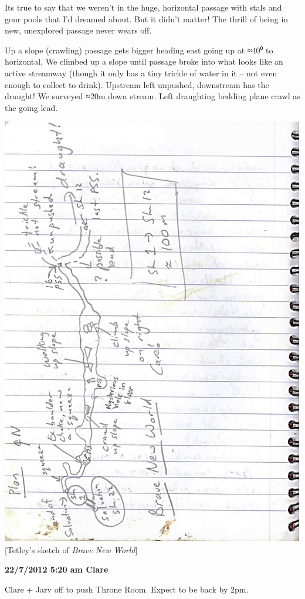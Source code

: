 Its true to say that we weren't in the huge, horizontal passage with
stals and gour pools that I'd dreamed about. But it didn't matter! The
thrill of being in new, unexplored passage never wears off.

Up a slope (crawling) passage gets bigger heading east going up at ≈40⁰
to horizontal. We climbed up a slope until passage broke into what looks
like an active streamway (though it only has a tiny trickle of water in
it -- not even enough to collect to drink). Upstream left unpushed,
downstream has the draught! We surveyed ≈20m down stream. Left
draughting bedding plane crawl as the going lead.

\includegraphics{UgLog1012/66.jpeg}{[}Tetley's sketch of \emph{Brave New
World}{]}

\textbf{22/7/2012 5:20 am Clare}

Clare + Jarv off to push Throne Room. Expect to be back by 2pm.

